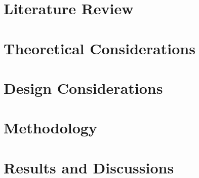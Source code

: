 \chapter{Literature Review} 
\label{ch:litrev} 
\startcontents[chapters]
\begin{SingleSpace}	
	\Mprintcontents 
\end{SingleSpace}

\stopcontents[chapters]
\cleardoublepage

\chapter{Theoretical Considerations}
\label{ch:theorycon}
\startcontents[chapters]
\begin{SingleSpace}	
	\Mprintcontents 
\end{SingleSpace}

\stopcontents[chapters]
\cleardoublepage

\chapter{Design Considerations} 
\label{ch:designcon} 
\startcontents[chapters]
\begin{SingleSpace}	
	\Mprintcontents 
\end{SingleSpace}

\stopcontents[chapters]
\cleardoublepage

\chapter{Methodology} 
\label{ch:method} 
\startcontents[chapters]
\begin{SingleSpace}	
	\Mprintcontents 
\end{SingleSpace}

\stopcontents[chapters]
\cleardoublepage

\ifResultDiscuss 
	\chapter{Results and Discussions} 
	\label{ch:result_discuss} 
	\startcontents[chapters]
	\begin{SingleSpace}	
		\Mprintcontents 
	\end{SingleSpace}
	
	\stopcontents[chapters]
	\cleardoublepage
\fi

